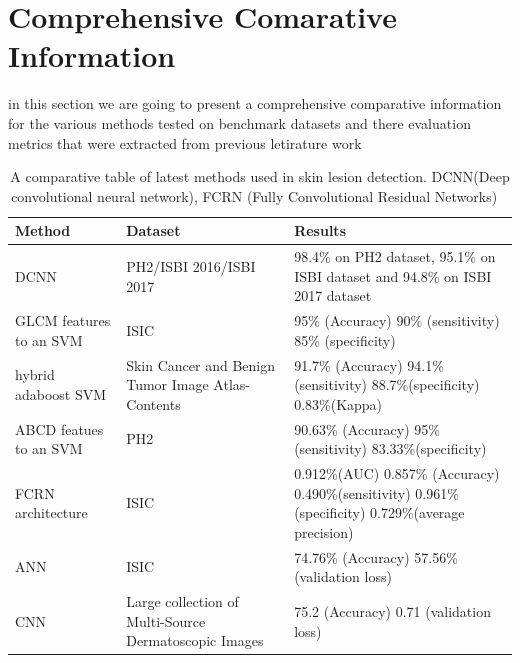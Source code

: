 \section{Comprehensive Comarative Information}
in this section we are going to present a comprehensive comparative information for the various methods tested on benchmark datasets and there evaluation metrics that were extracted from previous letirature work

\begin{table}[htbp]
    \begin{center}
        \begin{tabular}{p{3cm}|p{3cm}|p{6cm}}
        \hline 
        Method & Dataset & Results  \\ 
        \hline 
         DCNN & PH2/ISBI 2016/ISBI 2017 & 98.4\% on PH2 dataset, 95.1\% on ISBI dataset and 94.8\% on ISBI 2017 dataset \\ 
        \hline 
         GLCM features to an SVM & ISIC & 95\% (Accuracy) 90\% (sensitivity) 85\% (specificity) \\ 
        \hline 
            hybrid adaboost SVM  & Skin Cancer and Benign Tumor Image Atlas-Contents & 91.7\% (Accuracy) 94.1\%(sensitivity) 88.7\%(specificity) 0.83\%(Kappa) \\ 
        \hline 
            ABCD featues to an SVM & PH2 & 90.63\% (Accuracy) 95\% (sensitivity) 83.33\%(specificity) \\ 
        \hline 
         FCRN architecture & ISIC & 0.912\%(AUC) 0.857\% (Accuracy) 0.490\%(sensitivity) 0.961\%(specificity) 0.729\%(average precision) \\ 
        \hline 
         ANN & ISIC & 74.76\% (Accuracy) 57.56\% (validation loss) \\ 
        \hline 
         CNN & Large collection of Multi-Source Dermatoscopic Images & 75.2 (Accuracy) 0.71 (validation loss) \\ 
        \hline 
        \end{tabular} 
    \end{center}
    \caption{A comparative table of latest methods used in skin lesion detection. DCNN(Deep convolutional neural network), FCRN (Fully Convolutional Residual Networks) ~\cite{}}
    \label{tab:}
    \end{table}
 
    












